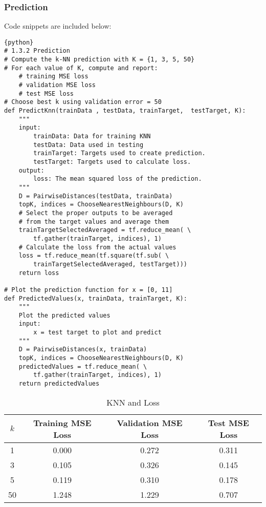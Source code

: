 \documentclass[a4paper,12pt]{article}
\begin{document}
\subsubsection{Prediction}
Code snippets are included below:
\begin{verbatim}
{python}
# 1.3.2 Prediction
# Compute the k-NN prediction with K = {1, 3, 5, 50}
# For each value of K, compute and report:
    # training MSE loss
    # validation MSE loss
    # test MSE loss
# Choose best k using validation error = 50
def PredictKnn(trainData , testData, trainTarget,  testTarget, K):
    """
    input:
        trainData: Data for training KNN
        testData: Data used in testing
        trainTarget: Targets used to create prediction.
        testTarget: Targets used to calculate loss. 
    output:
        loss: The mean squared loss of the prediction.
    """
    D = PairwiseDistances(testData, trainData)
    topK, indices = ChooseNearestNeighbours(D, K)
    # Select the proper outputs to be averaged
    # from the target values and average them
    trainTargetSelectedAveraged = tf.reduce_mean( \
    	tf.gather(trainTarget, indices), 1)
    # Calculate the loss from the actual values
    loss = tf.reduce_mean(tf.square(tf.sub( \
    	trainTargetSelectedAveraged, testTarget)))
    return loss

# Plot the prediction function for x = [0, 11]
def PredictedValues(x, trainData, trainTarget, K):
    """
    Plot the predicted values
    input:
        x = test target to plot and predict
    """
    D = PairwiseDistances(x, trainData)
    topK, indices = ChooseNearestNeighbours(D, K)
    predictedValues = tf.reduce_mean( \
    	tf.gather(trainTarget, indices), 1)
    return predictedValues
\end{verbatim}
\begin{table}[ht]
\centering %
\caption{KNN and Loss} %
\label{table:KLoss} %
\begin{tabular}{c c c c} %
\hline %
$k$ & Training MSE Loss & Validation MSE Loss & Test MSE Loss \\ [0.5ex] 
\hline
1 & 0.000  & 0.272 & 0.311 \\
3 & 0.105  & 0.326 & 0.145 \\
5 & 0.119  & 0.310 & 0.178 \\
50 & 1.248 & 1.229 & 0.707 \\ [1ex] %
\hline %
\end{tabular}
\end{table}
\end{document}
